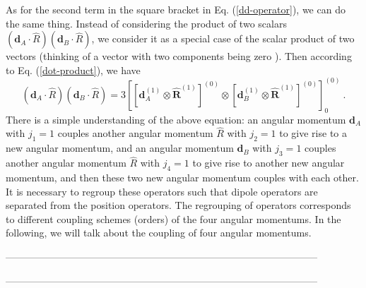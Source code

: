 As for the second term in the square bracket in Eq. (\ref{dd-operator}), we can do the same thing. Instead of considering the product of two scalars $(\mathbf{d}_{A}\cdot\hat{R})(\mathbf{d}_{B}\cdot\hat{R})$, we consider it as a special case of the scalar product of two vectors (thinking of a vector with two components being zero ). Then according to Eq. (\ref{dot-product}), we have
\begin{equation}
(\mathbf{d}_{A}\cdot\hat{R})(\mathbf{d}_{B}\cdot\hat{R})= 3\left[ \left[ \mathbf{d}_{A}^{(1)} \otimes \mathbf{\hat{R}}^{(1)} \right]^{(0)}\otimes \left[ \mathbf{d}_{B}^{(1)} \otimes \mathbf{\hat{R}}^{(1)} \right]^{(0)}  \right]_{0}^{(0)}  \ .
\end{equation}
There is a simple understanding of the above equation: an angular momentum $\mathbf{d}_{A}$ with $j_{1}=1$ couples  another angular momentum $\hat{R}$ with $j_{2}=1$ to give rise to a new angular momentum, and an angular momentum $\mathbf{d}_{B}$ with $j_{3}=1$ couples  another angular momentum $\hat{R}$ with $j_{4}=1$ to give rise to another new angular momentum, and then these two new angular momentum couples with each other. It is necessary to regroup these operators such that dipole operators are separated from the position operators. The regrouping of operators corresponds to different coupling schemes (orders) of the four angular momentums. In the following, we will talk about the coupling of four angular momentums.

-----------------------------------------------------------------------------------------------



-----------------------------------------------------------------------------------------------

